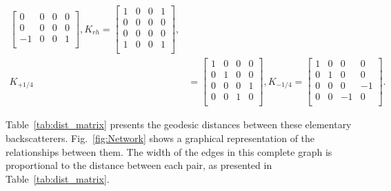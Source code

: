 \documentclass[conference]{IEEEtran}
\begin{document}
\begin{align*}
\begin{bmatrix}
0 & 0 & 0 & 0\\
0 & 0 & 0 & 0\\
-1 & 0 & 0 & 1\\
\end{bmatrix},
K_{rh}=
\begin{bmatrix}
1 & 0 & 0 & 1\\
0 & 0 & 0 & 0\\
0 & 0 & 0 & 0\\
1 & 0 & 0 & 1\\
\end{bmatrix}
,\\
K_{+1/4} &=
\begin{bmatrix}
1 & 0 & 0 & 0\\
0 & 1 & 0 & 0\\
0 & 0 & 0 & 1\\
0 & 0 & 1 & 0\\
\end{bmatrix},
K_{-1/4}=
\begin{bmatrix}
1 & 0 & 0 & 0\\
0 & 1 & 0 & 0\\
0 & 0 & 0 & -1\\
0 & 0 & -1 & 0\\
\end{bmatrix}
.
\end{align*}

Table~\ref{tab:dist_matrix} presents the geodesic distances between these elementary backscatterers.
Fig.~\ref{fig:Network} shows a graphical representation of the relationships between them.
The width of the edges in this complete graph is proportional to the distance between each pair, as presented in Table~\ref{tab:dist_matrix}.
\end{document}
